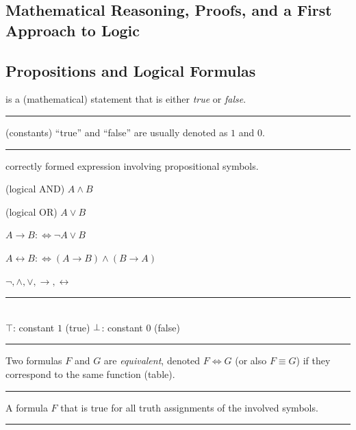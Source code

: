 \documentclass[a4paper]{extarticle}
\newcommand{\rtop}{\reflectbox{\rotatebox[origin=c]{180}{$\top$}}}
\newcommand{\sep}{\vspace{5pt}\noindent\hrule\vspace{5pt}}
\begin{document}
\setlength{\belowdisplayskip}{4pt}
\setlength{\abovedisplayskip}{4pt}
\setlength{\belowdisplayshortskip}{4pt}
\setlength{\abovedisplayshortskip}{4pt}

\setlength{\fboxsep}{1pt}


\begin{multicols*}{2}
\raggedcolumns

\section{Mathematical Reasoning, Proofs, and a First Approach to Logic}

\subsection{Propositions and Logical Formulas}

\Def[Proposition] is a (mathematical) statement that is either
\emph{true} or \emph{false}.

\sep

 (constants) ``true'' and ``false'' are usually
denoted as $1$ and $0$.

\sep

\Def[Formula] correctly formed expression involving propositional symbols.

\Def[Conjunction] (logical AND) $A\land B$

\Def[Disjunction] (logical OR) $A\lor B$

\Def[Implication] $A\rightarrow B :\Longleftrightarrow \lnot A \lor B$

 $A\leftrightarrow B \colon\Leftrightarrow
(A\rightarrow B) \land (B\rightarrow A)$

 $\lnot, \land,\lor,\rightarrow,\leftrightarrow$

\sep
{}
\\
$\top$: constant $1$ (true) \qquad
$\rtop$: constant 0 (false)

\sep

\Def[Equivalence] Two formulas $F$ and $G$ are \emph{equivalent}, denoted
$F\Longleftrightarrow G$ (or also $F\equiv G$) if they correspond to the same
function (table).

\sep

\Def[Tautology] A formula $F$ that is true for all truth assignments
of the involved symbols.

\sep


\end{multicols*}
\end{document}
